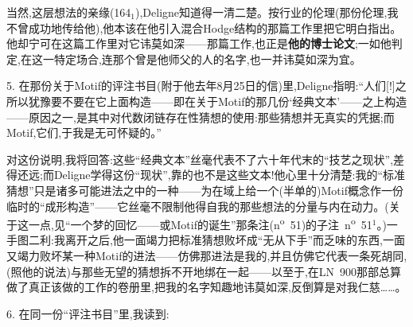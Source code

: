 \dmark{}当然,这层想法的亲缘(164$_{1}$),Deligne知道得一清二楚。按行业的伦理(那份伦理,我不曾成功地传给他),他本该在他引入混合Hodge结构的那篇工作里把它明白指出。他却宁可在这篇工作里对它讳莫如深——那篇工作,也正是\textbf{他的博士论文};一如他判定,在这一特定场合,连那个曾是他师父的人的名字,也一并讳莫如深为宜。

5. 在那份关于Motif的评注书目(附于他去年8月25日的信)里,Deligne指明:“人们[!]之所以犹豫要不要在它上面构造——即在关于Motif的那几份‘经典文本’——之上构造——原因之一,是其中对代数闭链存在性猜想的使用:那些猜想并无真实的凭据;而Motif,它们,于我是无可怀疑的。”

对这份说明,我将回答:这些“经典文本”丝毫代表不了六十年代末的“技艺之现状”,差得还远;而Deligne学得这份“现状”,靠的也不是这些文本!他心里十分清楚:我的“标准猜想”只是诸多可能进法之中的一种——为在域上给一个(半单的)Motif概念作一份临时的“成形构造”——它丝毫不限制他得自我的那些想法的分量与内在动力。(关于这一点,见“一个梦的回忆——或Motif的诞生”那条注(n\textsuperscript{o}~51)的子注~n\textsuperscript{o}~51$^1$。)一手图二利:我离开之后,他一面竭力把标准猜想败坏成“无从下手”而乏味的东西,一面又竭力败坏某一种Motif的进法——仿佛那进法是我的,并且仿佛它代表一条死胡同,(照他的说法)与那些无望的猜想拆不开地绑在一起——以至于,在LN~900那部总算做了真正该做的工作的卷册里,把我的名字\dmark{}知趣地讳莫如深,反倒算是对我仁慈……。

6. 在同一份“评注书目”里,我读到:

